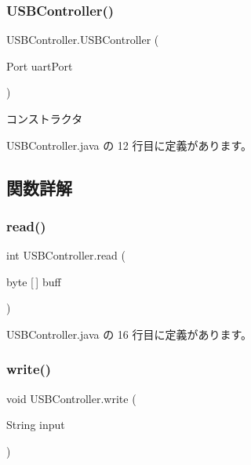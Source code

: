 \subsubsection{\texorpdfstring{USBController()}{USBController()}}
{\footnotesize\ttfamily U\+S\+B\+Controller.\+U\+S\+B\+Controller (\begin{DoxyParamCaption}\item[{Port}]{uart\+Port }\end{DoxyParamCaption})\hspace{0.3cm}{\ttfamily [inline]}}

コンストラクタ 

 U\+S\+B\+Controller.\+java の 12 行目に定義があります。



\subsection{関数詳解}
\mbox{\label{class_u_s_b_controller_a501ec097a24850ae2a6fae87c9b2eb8b}} 
\subsubsection{\texorpdfstring{read()}{read()}}
{\footnotesize\ttfamily int U\+S\+B\+Controller.\+read (\begin{DoxyParamCaption}\item[{byte \mbox{[}$\,$\mbox{]}}]{buff }\end{DoxyParamCaption})\hspace{0.3cm}{\ttfamily [inline]}}



 U\+S\+B\+Controller.\+java の 16 行目に定義があります。

\mbox{\label{class_u_s_b_controller_afe8a9c9fdb005132410e327153c984f4}} 
\subsubsection{\texorpdfstring{write()}{write()}}
{\footnotesize\ttfamily void U\+S\+B\+Controller.\+write (\begin{DoxyParamCaption}\item[{String}]{input }\end{DoxyParamCaption})\hspace{0.3cm}{\ttfamily [inline]}}



